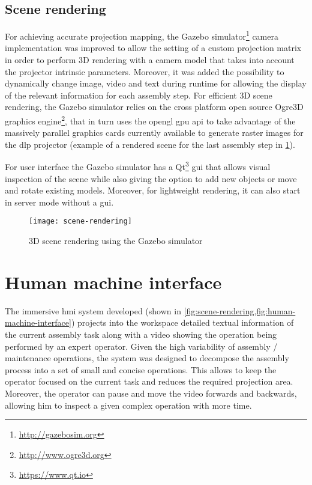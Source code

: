 \subsection{Scene rendering}

For achieving accurate projection mapping, the Gazebo simulator\footnote{\url{http://gazebosim.org}} camera implementation was improved to allow the setting of a custom projection matrix in order to perform 3D rendering with a camera model that takes into account the projector intrinsic parameters. Moreover, it was added the possibility to dynamically change image, video and text during runtime for allowing the display of the relevant information for each assembly step.
For efficient 3D scene rendering, the Gazebo simulator relies on the cross platform open source Ogre3D graphics engine\footnote{\url{http://www.ogre3d.org}}, that in turn uses the \gls{opengl} \gls{gpu} \gls{api} to take advantage of the massively parallel graphics cards currently available to generate raster images for the \gls{dlp} projector (example of a rendered scene for the last assembly step in \cref{fig:scene-rendering}).

For user interface the Gazebo simulator has a Qt\footnote{\url{https://www.qt.io}} \gls{gui} that allows visual inspection of the scene while also giving the option to add new objects or move and rotate existing models. Moreover, for lightweight rendering, it can also start in server mode without a \gls{gui}.

\begin{figure}[ht]
	\centering
	\texttt{[image: scene-rendering]}
	\caption{3D scene rendering using the Gazebo simulator}
	\label{fig:scene-rendering}
\end{figure}



\section{Human machine interface}\label{sec:human-machine-interaction}

The immersive \gls{hmi} system developed (shown in \cref{fig:scene-rendering,fig:human-machine-interface}) projects into the workspace detailed textual information of the current assembly task along with a video showing the operation being performed by an expert operator. Given the high variability of assembly / maintenance operations, the system was designed to decompose the assembly process into a set of small and concise operations. This allows to keep the operator focused on the current task and reduces the required projection area. Moreover, the operator can pause and move the video forwards and backwards, allowing him to inspect a given complex operation with more time.


